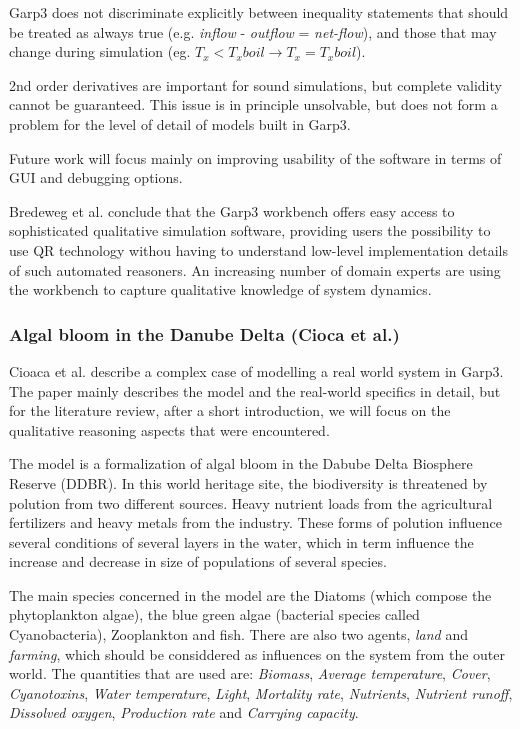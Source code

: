 \documentclass{article} %
\begin{document}
Garp3 does not discriminate explicitly between inequality statements that
should be treated as always true (e.g. \emph{inflow} - \emph{outflow} = 
\emph{net-flow}), and those that may change during simulation 
(eg. $T_x < T_xboil \rightarrow T_x = T_xboil$).

\vspace{0.8em}

2nd order derivatives are important for sound simulations, but complete
validity cannot be guaranteed. This issue is in principle unsolvable, but does
not form a problem for the level of detail of models built in Garp3.  

Future work will focus mainly on improving usability of the software in terms
of GUI and debugging options.

Bredeweg et al. conclude that the Garp3 workbench offers easy access to 
sophisticated qualitative simulation software, providing users the 
possibility to use QR technology withou having to understand low-level 
implementation details of such automated reasoners. An increasing number of 
domain experts are using the workbench to capture qualitative knowledge of 
system dynamics.  

\subsubsection{Algal bloom in the Danube Delta (Cioca et al.)}
\label{sec:litrev_qr_cioca}
Cioaca et al. describe a complex case of modelling a real world system in Garp3.
The paper mainly describes the model and the real-world specifics in detail, but 
for the literature review, after a short introduction, we will focus on the 
qualitative reasoning aspects that were encountered.

\vspace{0.8em}

The model is a formalization of algal bloom in the Dabube Delta Biosphere
Reserve (DDBR). In this world heritage site, the biodiversity is threatened by
polution from two different sources. Heavy nutrient loads from the agricultural 
fertilizers and heavy metals from the industry. These forms of polution
influence several conditions of several layers in the water, which in term
influence the increase and decrease in size of populations of several species.

The main species concerned in the model are the Diatoms (which compose the
phytoplankton algae), the blue green algae (bacterial species called
Cyanobacteria), Zooplankton and fish. There are also two agents, \emph{land} and
\emph{farming}, which should be considdered as influences on the system from the
outer world. The quantities that are used are: \emph{Biomass}, \emph{Average
temperature}, \emph{Cover}, \emph{Cyanotoxins}, \emph{Water temperature},
\emph{Light}, \emph{Mortality rate}, \emph{Nutrients}, \emph{Nutrient runoff},
\emph{Dissolved oxygen}, \emph{Production rate} and \emph{Carrying capacity}.
\end{document}

